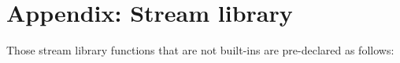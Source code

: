 \section*{Appendix: Stream library}

Those stream library functions that are not built-ins are pre-declared as follows:


